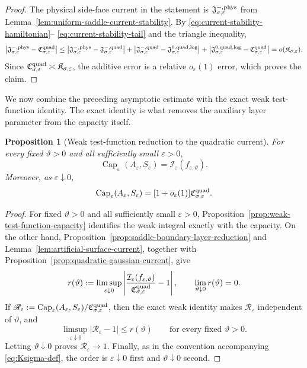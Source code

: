\documentclass[11pt]{article}
\numberwithin{equation}{section}
\theoremstyle{plain}
\newtheorem{proposition}[theorem]{Proposition}
\theoremstyle{definition}
\theoremstyle{remark}
\newcommand{\eps}{\varepsilon}
\renewcommand{\Cap}{\operatorname{Cap}}
\begin{document}
\begin{proof}
The physical side-face current in the statement is
$\mathfrak J_{\sigma,\eps}^{-,\rm phys}$ from
Lemma~\ref{lem:uniform-saddle-current-stability}.  By
\eqref{eq:current-stability-hamiltonian}--
\eqref{eq:current-stability-tail} and the triangle inequality,
\[
\left|\mathfrak J_{\sigma,\eps}^{-,\rm phys}
-\mathfrak C_{\sigma,\eps}^{\rm quad}\right|
\le
\left|\mathfrak J_{\sigma,\eps}^{-,\rm phys}
-\mathfrak J_{\sigma,\eps}^{-,\rm quad}\right|
+
\left|\mathfrak J_{\sigma,\eps}^{-,\rm quad}
-\mathfrak J_{\sigma,\eps}^{0,\rm quad,log}\right|
+
\left|\mathfrak J_{\sigma,\eps}^{0,\rm quad,log}
-\mathfrak C_{\sigma,\eps}^{\rm quad}\right|
=o(\mathfrak K_{\sigma,\eps}).
\]
Since $\mathfrak C_{\sigma,\eps}^{\rm quad}\asymp
\mathfrak K_{\sigma,\eps}$, the additive error is a relative $o_\eps(1)$ error,
which proves the claim.
\end{proof}

We now combine the preceding asymptotic estimate with the exact
weak test-function identity.  The exact identity is what removes the auxiliary
layer parameter from the capacity itself.

\begin{proposition}[Weak test-function reduction to the quadratic current]
\label{prop:weak-test-function-capacity-reduction}
For every fixed $\vartheta>0$ and all sufficiently small $\eps>0$,
\[
\Cap_\eps(A_\eps,S_\eps)=\mathcal I_\eps(f_{\eps,\vartheta}).
\]
Moreover, as $\eps\downarrow 0$,
\[
\Cap_\eps(A_\eps,S_\eps)
=[1+o_\eps(1)]\mathfrak C_{\sigma,\eps}^{\rm quad}.
\]
\end{proposition}

\begin{proof}
For fixed $\vartheta>0$ and all sufficiently small $\eps>0$,
Proposition~\ref{prop:weak-test-function-capacity} identifies the weak
integral exactly with the capacity.  On the other hand,
Proposition~\ref{prop:saddle-boundary-layer-reduction} and
Lemma~\ref{lem:artificial-surface-current}, together with
Proposition~\ref{prop:quadratic-gaussian-current}, give
\[
r(\vartheta):=\limsup_{\eps\downarrow0}
\left|
\frac{\mathcal I_\eps(f_{\eps,\vartheta})}
{\mathfrak C_{\sigma,\eps}^{\rm quad}}-1
\right|,
\qquad
\lim_{\vartheta\downarrow0}r(\vartheta)=0.
\]
If
$\mathscr R_\eps:=\Cap_\eps(A_\eps,S_\eps)/\mathfrak C_{\sigma,\eps}^{\rm quad}$,
then the exact weak identity makes $\mathscr R_\eps$ independent of $\vartheta$, and
\[
\limsup_{\eps\downarrow0}|\mathscr R_\eps-1|\le r(\vartheta)
\qquad\text{for every fixed }\vartheta>0.
\]
Letting $\vartheta\downarrow0$ proves $\mathscr R_\eps\to1$.  Finally, as in the
convention accompanying \eqref{eq:Ksigma-def}, the order is
$\eps\downarrow0$ first and $\vartheta\downarrow0$ second.
\end{proof}
\end{document}
